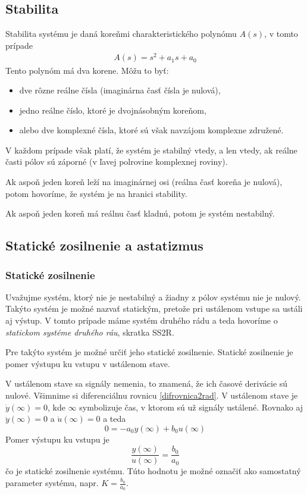 \documentclass[a4paper, 10pt, ]{article}
\begin{document}
\subsection{Stabilita}

Stabilita systému je daná koreňmi charakteristického polynómu $A(s)$, v tomto prípade
\begin{align}
    A(s) = s^2 + a_1 s + a_0
\end{align}
Tento polynóm má dva korene. Môžu to byť:
\begin{itemize}[leftmargin=0pt, labelsep=3mm, itemsep=0pt]
    \item dve rôzne reálne čísla (imaginárna časť čísla je nulová),
    \item jedno reálne číslo, ktoré je dvojnásobným koreňom,
    \item alebo dve komplexné čísla, ktoré sú však navzájom komplexne združené.
\end{itemize}
V každom prípade však platí, že systém je stabilný vtedy, a len vtedy, ak reálne časti pólov sú záporné (v ľavej polrovine komplexnej roviny).

Ak aspoň jeden koreň leží na imaginárnej osi (reálna časť koreňa je nulová), potom hovoríme, že systém je na hranici stability.

Ak aspoň jeden koreň má reálnu časť kladnú, potom je systém nestabilný.



\subsection{Statické zosilnenie a astatizmus}

\subsubsection{Statické zosilnenie}

Uvažujme systém, ktorý nie je nestabilný a žiadny z pólov systému nie je nulový. Takýto systém je možné nazvať statickým, pretože pri ustálenom vstupe sa ustáli aj výstup. V tomto prípade máme systém druhého rádu a teda hovoríme o \emph{statickom systéme druhého ráu}, skratka SS2R. 

Pre takýto systém je možné určiť jeho statické zosilnenie. Statické zosilnenie je pomer výstupu ku vstupu v ustálenom stave.

V ustálenom stave sa signály nemenia, to znamená, že ich časové derivácie sú nulové. Všimnime si diferenciálnu rovnicu \eqref{difrovnica2rad}. 
V ustálenom stave je $\dot y(\infty) = 0$, kde $\infty$ symbolizuje čas, v ktorom sú už signály ustálené. Rovnako aj $\ddot y(\infty) = 0$ a $\dot u(\infty) = 0$ a teda
\begin{equation}
    0 = -a_0 y(\infty) + b_0 u(\infty)
\end{equation}
Pomer výstupu ku vstupu je
\begin{equation}
    \frac{y(\infty)}{u(\infty)} = \frac{b_0}{a_0}
\end{equation}
čo je statické zosilnenie systému. Túto hodnotu je možné označiť ako samostatný parameter systému, napr. $K = \frac{b_0}{a_0}$.
\end{document}
